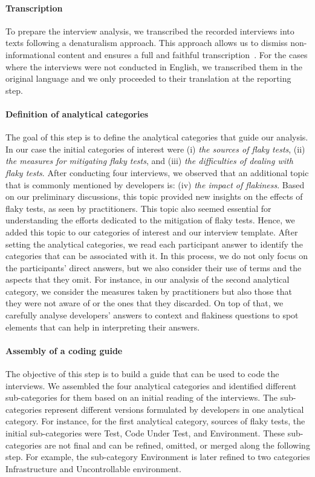 \paragraph{Transcription}
To prepare the interview analysis, we transcribed the recorded interviews into texts following a denaturalism approach.
This approach allows us to dismiss non-informational content and ensures a full and faithful transcription~\cite{oliver2005constraints}.
For the cases where the interviews were not conducted in English, we transcribed them in the original language and we only proceeded to their translation at the reporting step.

\paragraph{Definition of analytical categories}
The goal of this step is to define the analytical categories that guide our analysis.
In our case the initial categories of interest were (i) \textit{the sources of flaky tests}, (ii) \textit{the measures for mitigating flaky tests}, and (iii) \textit{the difficulties of dealing with flaky tests}.
After conducting four interviews, we observed that an additional topic that is commonly mentioned by developers is: (iv) \textit{the impact of flakiness}.
Based on our preliminary discussions, this topic provided new insights on the effects of flaky tests, as seen by practitioners.
This topic also seemed essential for understanding the efforts dedicated to the mitigation of flaky tests.
Hence, we added this topic to our categories of interest and our interview template.
After setting the analytical categories, we read each participant answer to identify the categories that can be associated with it.
In this process, we do not only focus on the participants' direct answers, but we also consider their use of terms and the aspects that they omit.
For instance, in our analysis of the second analytical category, we consider the measures taken by practitioners but also those that they were not aware of or the ones that they discarded.
On top of that, we carefully analyse developers' answers to context and flakiness questions to spot elements that can help in interpreting their answers.

\paragraph{Assembly of a coding guide}
The objective of this step is to build a guide that can be used to code the interviews.
We assembled the four analytical categories and identified different sub-categories for them based on an initial reading of the interviews.
The sub-categories represent different versions formulated by developers in one  analytical category.
For instance, for the first analytical category, \ie sources of flaky tests, the initial sub-categories were \textsf{Test}, \textsf{Code Under Test}, and \textsf{Environment}.
These sub-categories are not final and can be refined, omitted, or merged along the following step.
For example, the sub-category \textsf{Environment} is later refined to two categories \textsf{Infrastructure} and \textsf{Uncontrollable environment}.

